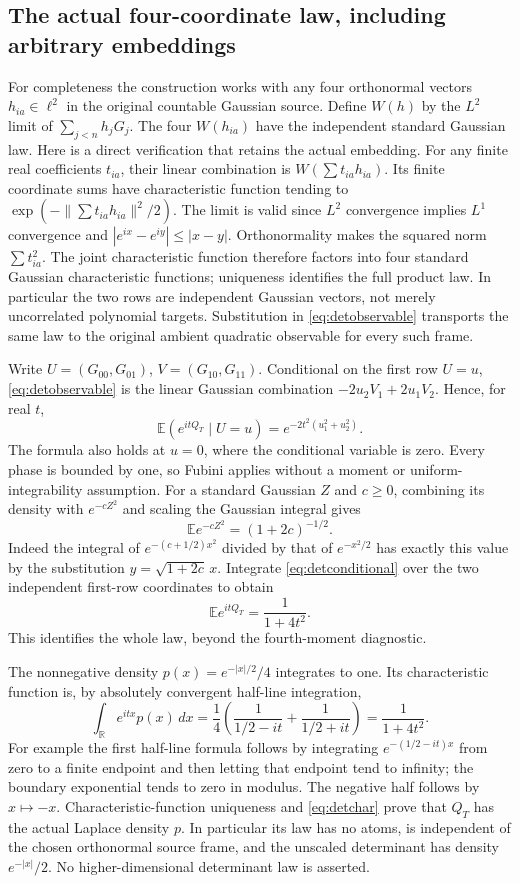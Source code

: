\documentclass[11pt]{article}
\newcommand{\E}{\mathbb E}
\newcommand{\R}{\mathbb R}
\begin{document}
\subsection{The actual four-coordinate law, including arbitrary embeddings}
For completeness the construction works with any four orthonormal
vectors $h_{ia}\in\ell^2$ in the original countable Gaussian source.
Define $W(h)$ by the $L^2$ limit of $\sum_{j<n}h_jG_j$.
The four $W(h_{ia})$ have the independent standard Gaussian law.
Here is a direct verification that retains the actual embedding.
For any finite real coefficients $t_{ia}$, their linear combination
is $W(\sum t_{ia}h_{ia})$. Its finite coordinate sums have
characteristic function tending to
$\exp(-\|\sum t_{ia}h_{ia}\|^2/2)$.
The limit is valid since $L^2$ convergence implies $L^1$
convergence and $|e^{ix}-e^{iy}|\leq|x-y|$.
Orthonormality makes the squared norm $\sum t_{ia}^2$.
The joint characteristic function therefore factors into four
standard Gaussian characteristic functions; uniqueness identifies
the full product law. In particular the two rows are independent
Gaussian vectors, not merely uncorrelated polynomial targets.
Substitution in \eqref{eq:detobservable} transports the same law
to the original ambient quadratic observable for every such frame.

Write $U=(G_{00},G_{01})$, $V=(G_{10},G_{11})$. Conditional
on the first row $U=u$, \eqref{eq:detobservable} is the linear
Gaussian combination $-2u_2V_1+2u_1V_2$. Hence, for real $t$,
\begin{equation}\label{eq:detconditional}
 \E(e^{itQ_T}\mid U=u)=e^{-2t^2(u_1^2+u_2^2)}.
\end{equation}
The formula also holds at $u=0$, where the conditional variable
is zero. Every phase is bounded by one, so Fubini applies without
a moment or uniform-integrability assumption. For a standard
Gaussian $Z$ and $c\geq0$, combining its density with
$e^{-cZ^2}$ and scaling the Gaussian integral gives
\[
 \E e^{-cZ^2}=(1+2c)^{-1/2}.
\]
Indeed the integral of $e^{-(c+1/2)x^2}$ divided by that of
$e^{-x^2/2}$ has exactly this value by the substitution
$y=\sqrt{1+2c}\,x$. Integrate \eqref{eq:detconditional} over
the two independent first-row coordinates to obtain
\begin{equation}\label{eq:detchar}
 \E e^{itQ_T}=\frac1{1+4t^2}.
\end{equation}
This identifies the whole law, beyond the fourth-moment diagnostic.

The nonnegative density $p(x)=e^{-|x|/2}/4$ integrates to one.
Its characteristic function is, by absolutely convergent half-line
integration,
\[
 \int_\R e^{itx}p(x)\,dx
 =\frac14\left(\frac1{1/2-it}+\frac1{1/2+it}\right)
 =\frac1{1+4t^2}.
\]
For example the first half-line formula follows by integrating
$e^{-(1/2-it)x}$ from zero to a finite endpoint and then letting
that endpoint tend to infinity; the boundary exponential tends
to zero in modulus. The negative half follows by $x\mapsto-x$.
Characteristic-function uniqueness and \eqref{eq:detchar} prove
that $Q_T$ has the actual Laplace density $p$. In particular its
law has no atoms, is independent of the chosen orthonormal
source frame, and the unscaled determinant has density
$e^{-|x|}/2$. No higher-dimensional determinant law is asserted.
\end{document}
